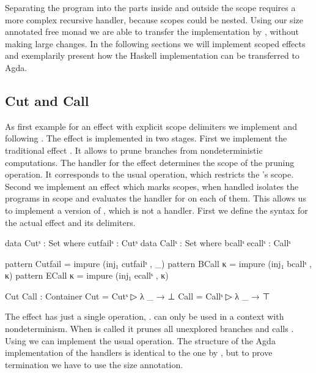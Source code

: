 Separating the program into the parts inside and outside the scope requires a
more complex recursive handler, because scopes could be nested. 
Using our size annotated free monad we are able to transfer the implementation
by \textcite{DBLP:conf/haskell/WuSH14}, without making large changes.
In the following sections we will implement scoped effects and exemplarily
present how the Haskell implementation can be transferred to Agda.


\subsection{Cut and Call}

As first example for an effect with explicit scope delimiters we implement
 and  following \textcite{DBLP:conf/haskell/WuSH14}.
The effect is implemented in two stages.
First we implement the traditional effect .
It allows to prune branches from nondeterministic computations.
The handler for the effect determines the scope of the pruning operation.
It corresponds to the usual  operation, which restricts the
's scope.
Second we implement an effect which marks scopes, when handled isolates the
programs in scope and evaluates the handler for  on each
of them.
This allows us to implement a version of , which is not a
handler.
First we define the syntax for the actual effect and its delimiters.

\begin{code}
data Cutˢ   : Set where cutfailˢ : Cutˢ
data Callˢ  : Set where bcallˢ ecallˢ : Callˢ

pattern Cutfail   = impure (inj₁ cutfailˢ , _)
pattern BCall  κ  = impure (inj₁ bcallˢ , κ)
pattern ECall  κ  = impure (inj₁ ecallˢ , κ)

Cut Call : Container
Cut   = Cutˢ    ▷ λ _ → ⊥
Call  = Callˢ   ▷ λ _ → ⊤
\end{code}
The  effect has just a single operation, .
 can only be used in a context with nondeterminism.
When  is called it prunes all unexplored branches and
calls .
Using  we can implement the usual 
operation.
The structure of the Agda implementation of the handlers is identical to the one
by \textcite{DBLP:conf/haskell/WuSH14}, but to prove termination we have to use
the size annotation.

